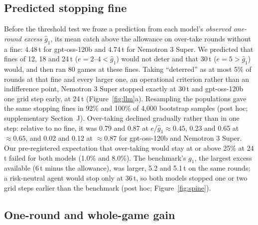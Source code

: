 \documentclass[letterpaper]{article} %
\newcommand{\gone}{g_1}
\begin{document}
\subsection{Predicted stopping fine}

Before the threshold test we froze a prediction from each model's \emph{observed one-round excess} $\hat g_1$, its mean catch above the allowance on over-take rounds without a fine: 4.48\,t for gpt-oss-120b and 4.74\,t for Nemotron 3 Super. We predicted that fines of 12, 18 and 24\,t ($e=2$--$4<\hat g_1$) would not deter and that 30\,t ($e=5>\hat g_1$) would, and then ran 80 games at these fines. Taking ``deterred'' as at most 5\% of rounds at that fine and every larger one, an operational criterion rather than an indifference point, Nemotron 3 Super stopped exactly at 30\,t and gpt-oss-120b one grid step early, at 24\,t (Figure~\ref{fig:llm}a). Resampling the populations gave the same stopping fines in 92\% and 100\% of 4{,}000 bootstrap samples (post hoc; supplementary Section~J). Over-taking declined gradually rather than in one step: relative to no fine, it was 0.79 and 0.87 at $e/\hat g_1\approx0.45$, 0.23 and 0.65 at $\approx0.65$, and 0.02 and 0.12 at $\approx0.87$ for gpt-oss-120b and Nemotron 3 Super. Our pre-registered expectation that over-taking would stay at or above 25\% at 24\,t failed for both models (1.0\% and 8.0\%). The benchmark's $\gone$, the largest excess available ($6$\,t minus the allowance), was larger, 5.2 and 5.1\,t on the same rounds; a risk-neutral agent would stop only at 36\,t, so both models stopped one or two grid steps earlier than the benchmark (post hoc; Figure~\ref{fig:spine}).


\subsection{One-round and whole-game gain}
\end{document}
